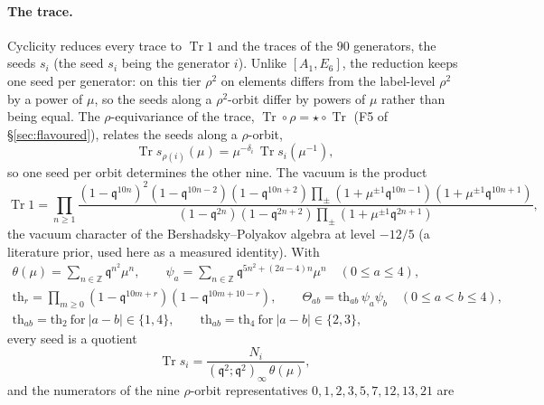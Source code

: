 \documentclass[11pt]{amsart}
\DeclareMathOperator{\Tr}{Tr}
\newcommand\fq{\mathfrak{q}}
\newcommand\bZ{\mathbb{Z}}
\theoremstyle{remark}
\begin{document}
\paragraph{The trace.}  Cyclicity reduces every trace to $\Tr1$ and the
traces of the $90$ generators, the seeds $s_i$ (the seed $s_i$ being the
generator $i$).  Unlike $[A_1,E_6]$, the reduction keeps one seed per
generator: on this tier $\rho^2$ on elements differs from the label-level
$\rho^2$ by a power of $\mu$, so the seeds along a $\rho^2$-orbit differ by
powers of $\mu$ rather than being equal.  The $\rho$-equivariance of the
trace, $\Tr\circ\rho=\star\circ\Tr$ (F5 of \S\ref{sec:flavoured}), relates the
seeds along a $\rho$-orbit,
\begin{equation}\label{eq:comp-e7-rule}
  \Tr s_{\rho(i)}(\mu)=\mu^{-\delta_i}\,\Tr s_i(\mu^{-1}),
\end{equation}
so one seed per orbit determines the other nine.  The vacuum is the product
\begin{equation}\label{eq:comp-e7-vacuum}
  \Tr1=\prod_{n\ge1}\frac{(1-\fq^{10n})^2(1-\fq^{10n-2})(1-\fq^{10n+2})
      \prod_{\pm}(1+\mu^{\pm1}\fq^{10n-1})(1+\mu^{\pm1}\fq^{10n+1})}
    {(1-\fq^{2n})(1-\fq^{2n+2})\prod_{\pm}(1+\mu^{\pm1}\fq^{2n+1})},
\end{equation}
the vacuum character of the Bershadsky--Polyakov algebra at level $-12/5$ (a
literature prior, used here as a measured identity).  With
\begin{equation}\label{eq:comp-e7-blocks}
\begin{gathered}
  \theta(\mu)=\sum_{n\in\bZ}\fq^{n^2}\mu^n,\qquad
  \psi_a=\sum_{n\in\bZ}\fq^{5n^2+(2a-4)n}\mu^n\quad(0\le a\le4),\\
  \mathrm{th}_r=\prod_{m\ge0}(1-\fq^{10m+r})(1-\fq^{10m+10-r}),\qquad
  \Theta_{ab}=\mathrm{th}_{ab}\,\psi_a\psi_b\quad(0\le a<b\le4),\\
  \mathrm{th}_{ab}=\mathrm{th}_2\ \text{for}\ |a-b|\in\{1,4\},\qquad
  \mathrm{th}_{ab}=\mathrm{th}_4\ \text{for}\ |a-b|\in\{2,3\},
\end{gathered}
\end{equation}
every seed is a quotient
\begin{equation}\label{eq:comp-e7-seed}
  \Tr s_i=\frac{N_i}{(\fq^2;\fq^2)_\infty\,\theta(\mu)} ,
\end{equation}
and the numerators of the nine $\rho$-orbit representatives
$0,1,2,3,5,7,12,13,21$ are
\end{document}
